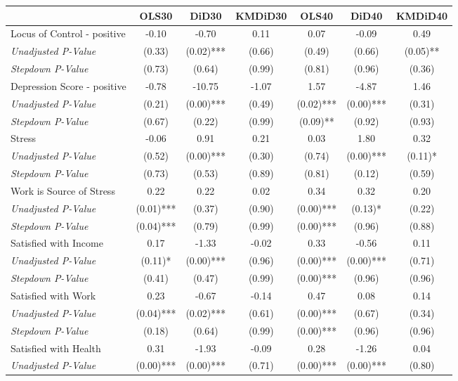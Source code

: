 \begin{tabular}{l c c c c c c}
\toprule
 & OLS30 & DiD30 & KMDiD30 & OLS40 & DiD40 & KMDiD40 \\
\midrule
Locus of Control - positive & -0.10 & -0.70 & 0.11 & 0.07 & -0.09 & 0.49 \\
\quad \textit{Unadjusted P-Value} & (0.33) & (0.02)*** & (0.66) & (0.49) & (0.66) & (0.05)** \\
\quad \textit{Stepdown P-Value} & (0.73) & (0.64) & (0.99) & (0.81) & (0.96) & (0.36) \\
Depression Score - positive & -0.78 & -10.75 & -1.07 & 1.57 & -4.87 & 1.46 \\
\quad \textit{Unadjusted P-Value} & (0.21) & (0.00)*** & (0.49) & (0.02)*** & (0.00)*** & (0.31) \\
\quad \textit{Stepdown P-Value} & (0.67) & (0.22) & (0.99) & (0.09)** & (0.92) & (0.93) \\
Stress & -0.06 & 0.91 & 0.21 & 0.03 & 1.80 & 0.32 \\
\quad \textit{Unadjusted P-Value} & (0.52) & (0.00)*** & (0.30) & (0.74) & (0.00)*** & (0.11)* \\
\quad \textit{Stepdown P-Value} & (0.73) & (0.53) & (0.89) & (0.81) & (0.12) & (0.59) \\
Work is Source of Stress & 0.22 & 0.22 & 0.02 & 0.34 & 0.32 & 0.20 \\
\quad \textit{Unadjusted P-Value} & (0.01)*** & (0.37) & (0.90) & (0.00)*** & (0.13)* & (0.22) \\
\quad \textit{Stepdown P-Value} & (0.04)*** & (0.79) & (0.99) & (0.00)*** & (0.96) & (0.88) \\
Satisfied with Income & 0.17 & -1.33 & -0.02 & 0.33 & -0.56 & 0.11 \\
\quad \textit{Unadjusted P-Value} & (0.11)* & (0.00)*** & (0.96) & (0.00)*** & (0.00)*** & (0.71) \\
\quad \textit{Stepdown P-Value} & (0.41) & (0.47) & (0.99) & (0.00)*** & (0.96) & (0.96) \\
Satisfied with Work & 0.23 & -0.67 & -0.14 & 0.47 & 0.08 & 0.14 \\
\quad \textit{Unadjusted P-Value} & (0.04)*** & (0.02)*** & (0.61) & (0.00)*** & (0.67) & (0.34) \\
\quad \textit{Stepdown P-Value} & (0.18) & (0.64) & (0.99) & (0.00)*** & (0.96) & (0.96) \\
Satisfied with Health & 0.31 & -1.93 & -0.09 & 0.28 & -1.26 & 0.04 \\
\quad \textit{Unadjusted P-Value} & (0.00)*** & (0.00)*** & (0.71) & (0.00)*** & (0.00)*** & (0.80) \\

\end{tabular}
